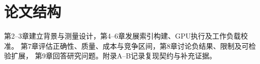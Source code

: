 \section{论文结构}
\label{sec:1-6}
第2--3章建立背景与测量设计，第4--6章发展索引构建、GPU执行及工作负载校准。
第7章评估正确性、质量、成本与竞争区间，第8章讨论负结果、限制及可检验扩展，
第9章回答研究问题。附录A--B记录复现契约与补充证据。
